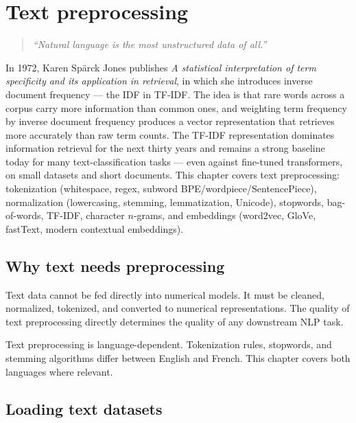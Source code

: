 \chapter{Text preprocessing}
\label{ch:text-preprocessing}

\begin{quote}
\emph{``Natural language is the most unstructured data of all.''}
\end{quote}

In 1972, Karen Spärck Jones publishes \emph{A statistical interpretation of term specificity and its application in retrieval}, in which she introduces inverse document frequency --- the IDF in TF-IDF. The idea is that rare words across a corpus carry more information than common ones, and weighting term frequency by inverse document frequency produces a vector representation that retrieves more accurately than raw term counts. The TF-IDF representation dominates information retrieval for the next thirty years and remains a strong baseline today for many text-classification tasks --- even against fine-tuned transformers, on small datasets and short documents. This chapter covers text preprocessing: tokenization (whitespace, regex, subword BPE/wordpiece/SentencePiece), normalization (lowercasing, stemming, lemmatization, Unicode), stopwords, bag-of-words, TF-IDF, character $n$-grams, and embeddings (word2vec, GloVe, fastText, modern contextual embeddings).

\section{Why text needs preprocessing}

Text data cannot be fed directly into numerical models. It must be cleaned, normalized, tokenized, and converted to numerical representations. The quality of text preprocessing directly determines the quality of any downstream NLP task.

\begin{datatip}
Text preprocessing is language-dependent. Tokenization rules, stopwords, and stemming algorithms differ between English and French. This chapter covers both languages where relevant.
\end{datatip}

\section{Loading text datasets}

